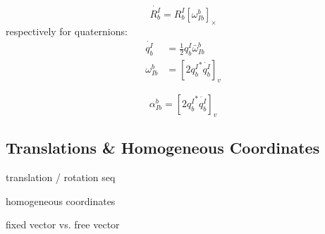 \documentclass[a4paper]{paper}
\begin{document}
\begin{equation}
    \dot {R_b^I} = R_b^I [\omega^b_{Ib}]_{\times}
\end{equation}
respectively for quaternions:
\begin{equation}
\begin{aligned}
    \dot {q_b^I} &= \frac{1}{2} q_b^I \bar\omega^b_{Ib}\\
    \omega^b_{Ib} &= \left[ 2  {q_b^I}^* \dot {q_b^I} \right]_v
\end{aligned}
\label{eq:rotation_qdot}
\end{equation}

\begin{equation}
    \alpha^b_{Ib} = \left[ 2  {q_b^I}^* \ddot {q_b^I} \right]_v
\label{eq:rotation_qdot2}
\end{equation}

\subsection{Translations \& Homogeneous Coordinates}

translation / rotation seq

homogeneous coordinates

fixed vector vs. free vector
\end{document}
